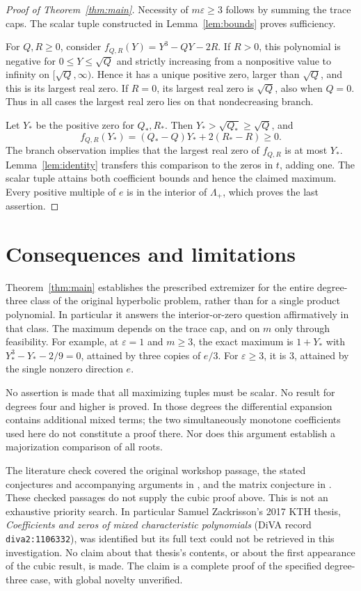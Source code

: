 \documentclass[11pt]{article}
\newcommand{\Lam}{\Lambda_+}
\begin{document}
\begin{proof}[Proof of Theorem~\ref{thm:main}]
Necessity of \(m\varepsilon\geq3\) follows by summing the trace caps.
The scalar tuple constructed in Lemma~\ref{lem:bounds} proves sufficiency.

For \(Q,R\geq0\), consider \(f_{Q,R}(Y)=Y^3-QY-2R\).
If \(R>0\), this polynomial is negative for
\(0\leq Y\leq\sqrt Q\) and strictly increasing from a nonpositive
value to infinity on \([\sqrt Q,\infty)\). Hence it has a unique
positive zero, larger than \(\sqrt Q\), and this is its largest real
zero. If \(R=0\), its largest real zero is \(\sqrt Q\), also when
\(Q=0\). Thus in all cases the largest real zero lies on that
nondecreasing branch.

Let \(Y_*\) be the positive zero for \(Q_*,R_*\). Then
\(Y_*>\sqrt{Q_*}\geq\sqrt Q\), and
\[
 f_{Q,R}(Y_*)=(Q_*-Q)Y_*+2(R_*-R)\geq0.
\]
The branch observation implies that the largest real zero of
\(f_{Q,R}\) is at most \(Y_*\). Lemma~\ref{lem:identity} transfers
this comparison to the zeros in \(t\), adding one. The scalar tuple
attains both coefficient bounds and hence the claimed maximum.
Every positive multiple of \(e\) is in the interior of \(\Lam\),
which proves the last assertion.
\end{proof}

\section{Consequences and limitations}

Theorem~\ref{thm:main} establishes the prescribed extremizer for the entire
degree-three class of the original hyperbolic problem, rather than for a
single product polynomial. In particular it answers the interior-or-zero
question affirmatively in that class. The maximum depends on the trace cap,
and on \(m\) only through feasibility. For example, at \(\varepsilon=1\)
and \(m\geq3\), the exact maximum is \(1+Y_*\) with
\(Y_*^3-Y_*-2/9=0\), attained by three copies of \(e/3\).
For \(\varepsilon\geq3\), it is \(3\), attained by the single nonzero
direction \(e\).

No assertion is made that all maximizing tuples must be scalar. No result
for degrees four and higher is proved. In those degrees the differential
expansion contains additional mixed terms; the two simultaneously monotone
coefficients used here do not constitute a proof there. Nor does this
argument establish a majorization comparison of all roots.

The literature check covered the original workshop passage, the stated
conjectures and accompanying arguments in \cite[Section 6]{Branden}, and
the matrix conjecture in \cite[Section 7]{MSS}. These checked passages
do not supply the cubic proof above. This is not an exhaustive priority
search. In particular Samuel Zackrisson's 2017 KTH thesis,
\emph{Coefficients and zeros of mixed characteristic polynomials}
(DiVA record \texttt{diva2:1106332}), was identified but its full text could
not be retrieved in this investigation. No claim about that thesis's
contents, or about the first appearance of the cubic result, is made.
The claim is a complete proof of the specified degree-three case, with
global novelty unverified.
\end{document}
